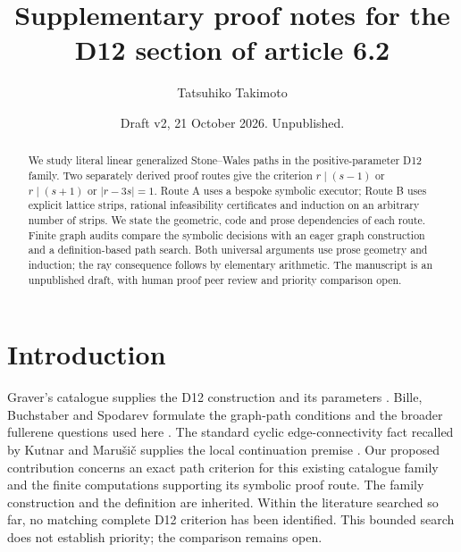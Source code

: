 \documentclass[11pt]{amsart}
\title{Supplementary proof notes for the D12 section of article 6.2}
\author{Tatsuhiko Takimoto}
\date{Draft v2, 21 October 2026. Unpublished.}
\theoremstyle{definition}\newtheorem{definition}[theorem]{Definition}
\begin{document}
\begin{abstract}
We study literal linear generalized Stone--Wales paths in the
positive-parameter D12 family. Two separately derived proof routes give
the criterion $r\mid(s-1)$ or $r\mid(s+1)$ or $|r-3s|=1$.
Route A uses a bespoke symbolic executor; Route B uses explicit
lattice strips, rational infeasibility certificates and induction on
an arbitrary number of strips. We state the geometric, code and prose
dependencies of each route. Finite graph audits compare the symbolic
decisions with an eager graph construction and a definition-based path
search. Both universal arguments use prose geometry and induction;
the ray consequence follows by elementary arithmetic. The manuscript
is an unpublished draft, with human proof peer review and priority
comparison open.
\end{abstract}
\maketitle

\section{Introduction}
Graver's catalogue supplies the D12 construction and its parameters
\cite{Graver}. Bille, Buchstaber and Spodarev formulate the graph-path
conditions and the broader fullerene questions used here \cite{BBS}.
The standard cyclic edge-connectivity fact recalled by Kutnar and
Maru\v{s}i\v{c} supplies the local continuation premise \cite{Connectivity}.
Our proposed contribution concerns an exact path criterion for this
existing catalogue family and the finite computations supporting its
symbolic proof route. The family construction and the definition are
inherited. Within the literature searched so far, no matching complete D12
criterion has been identified. This bounded search does not establish
priority; the comparison remains open.

\clearpage
\end{document}
